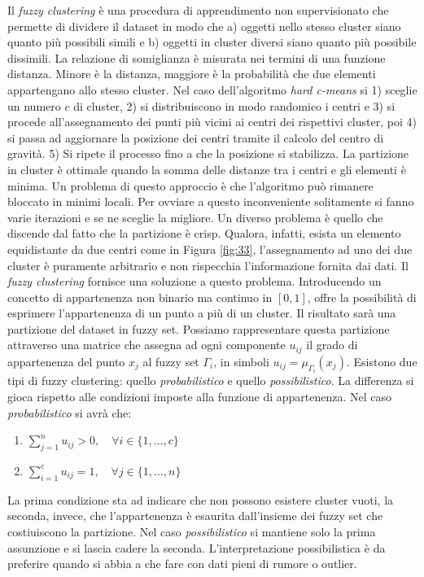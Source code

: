 \documentclass[10pt,a4paper]{article}
\begin{document}
Il \emph{fuzzy clustering} è una procedura di apprendimento non supervisionato che permette di dividere il dataset in modo che a) oggetti nello stesso cluster siano quanto più possibili simili e b) oggetti in cluster diversi siano quanto più possibile dissimili. La relazione di somiglianza è misurata nei termini di una funzione distanza. Minore è la distanza, maggiore è la probabilità che due elementi appartengano allo stesso cluster. Nel caso dell'algoritmo \emph{hard c-means} si 1) sceglie un numero $c$ di cluster, 2) si distribuiscono in modo randomico i centri e 3) si procede all'assegnamento dei punti più vicini ai centri dei rispettivi cluster, poi 4) si passa ad aggiornare la posizione dei centri tramite il calcolo del centro di gravità. 5) Si ripete il processo fino a che la posizione si stabilizza. La partizione in cluster è ottimale quando la somma delle distanze tra i centri e gli elementi è minima. Un problema di questo approccio è che l'algoritmo può rimanere bloccato in minimi locali. Per ovviare a questo inconveniente solitamente si fanno varie iterazioni e se ne sceglie la migliore. Un diverso problema è quello che discende dal fatto che la partizione è crisp. Qualora, infatti, esista un elemento equidistante da due centri come in Figura \ref{fig:33}, l'assegnamento ad uno dei due cluster è puramente arbitrario e non rispecchia l'informazione fornita dai dati. Il \emph{fuzzy clustering} fornisce una soluzione a questo problema. Introducendo un concetto di appartenenza non binario ma continuo in $[0,1]$, offre la possibilità di esprimere l'appartenenza di un punto a più di un cluster. Il risultato sarà una partizione del dataset in fuzzy set. Possiamo rappresentare questa partizione attraverso una matrice che assegna ad ogni componente $u_{ij}$ il grado di appartenenza del punto $x_j$ al fuzzy set $\Gamma_i$, in simboli $u_{ij} = \mu_{\Gamma_i}(x_j)$. Esistono due tipi di fuzzy clustering: quello \emph{probabilistico} e quello \emph{possibilistico}. La differenza si gioca rispetto alle condizioni imposte alla funzione di appartenenza. Nel caso \emph{probabilistico} si avrà che:

\begin{enumerate}
\item{$\sum_{j=1}^{n} u_{ij} > 0, \quad \forall i \in \{1,\dots,c \} $}
\item{$\sum_{i=1}^{c} u_{ij} = 1, \quad \forall j \in \{1,\dots,n \} $}
\end{enumerate}

La prima condizione sta ad indicare che non possono esistere cluster vuoti, la seconda, invece, che l'appartenenza è esaurita dall'insieme dei fuzzy set che costiuiscono la partizione. Nel caso \emph{possibilistico} si mantiene solo la prima assunzione e si lascia cadere la seconda. L'interpretazione possibilistica è da preferire quando si abbia a che fare con dati pieni di rumore o outlier.
\end{document}
